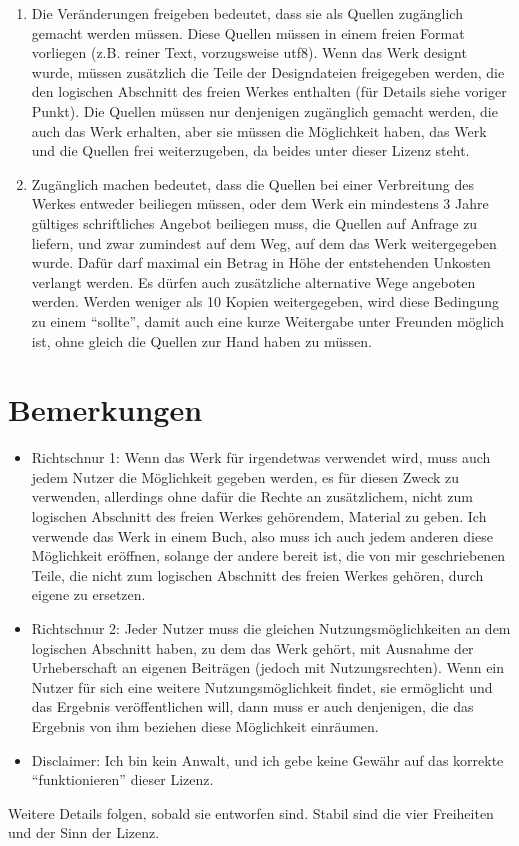 \documentclass[a4paper,10pt]{scrartcl}
\begin{document}
\begin{enumerate} 
\item Die Veränderungen freigeben bedeutet, dass sie als Quellen zugänglich gemacht werden müssen. Diese Quellen müssen in einem freien Format vorliegen (z.B. reiner Text, vorzugsweise utf8). Wenn das Werk designt wurde, müssen zusätzlich die Teile der Designdateien freigegeben werden, die den logischen Abschnitt des freien Werkes enthalten (für Details siehe voriger Punkt). Die Quellen müssen nur denjenigen zugänglich gemacht werden, die auch das Werk erhalten, aber sie müssen die Möglichkeit haben, das Werk und die Quellen frei weiterzugeben, da beides unter dieser Lizenz steht. 

\item Zugänglich machen bedeutet, dass die Quellen bei einer Verbreitung des Werkes entweder beiliegen müssen, oder dem Werk ein mindestens 3 Jahre gültiges schriftliches Angebot beiliegen muss, die Quellen auf Anfrage zu liefern, und zwar zumindest auf dem Weg, auf dem das Werk weitergegeben wurde. Dafür darf maximal ein Betrag in Höhe der entstehenden Unkosten verlangt werden. Es dürfen auch zusätzliche alternative Wege angeboten werden. Werden weniger als 10 Kopien weitergegeben, wird diese Bedingung zu einem "`sollte"', damit auch eine kurze Weitergabe unter Freunden möglich ist, ohne gleich die Quellen zur Hand haben zu müssen. 
\end{enumerate}

\section{Bemerkungen}

\begin{itemize}
\item Richtschnur 1: Wenn das Werk für irgendetwas verwendet wird, muss auch jedem Nutzer die Möglichkeit gegeben werden, es für diesen Zweck zu verwenden, allerdings ohne dafür die Rechte an zusätzlichem, nicht zum logischen Abschnitt des freien Werkes gehörendem, Material zu geben. Ich verwende das Werk in einem Buch, also muss ich auch jedem anderen diese Möglichkeit eröffnen, solange der andere bereit ist, die von mir geschriebenen Teile, die nicht zum logischen Abschnitt des freien Werkes gehören, durch eigene zu ersetzen. 

\item Richtschnur 2: Jeder Nutzer muss die gleichen Nutzungsmöglichkeiten an dem logischen Abschnitt haben, zu dem das Werk gehört, mit Ausnahme der Urheberschaft an eigenen Beiträgen (jedoch mit Nutzungsrechten). Wenn ein Nutzer für sich eine weitere Nutzungsmöglichkeit findet, sie ermöglicht und das Ergebnis veröffentlichen will, dann muss er auch denjenigen, die das Ergebnis von ihm beziehen diese Möglichkeit einräumen.

\item Disclaimer: Ich bin kein Anwalt, und ich gebe keine Gewähr auf das korrekte "`funktionieren"' dieser Lizenz. 
\end{itemize}


Weitere Details folgen, sobald sie entworfen sind. Stabil sind die vier Freiheiten und der Sinn der Lizenz.
\end{document}
